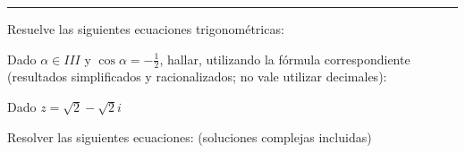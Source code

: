 \documentclass[addpoints,spanish, 12pt,a4paper]{exam}
\begin{document}
\noindent
\rule[2ex]{\textwidth}{2pt}
\begin{questions}

\question Resuelve las siguientes ecuaciones trigonométricas:

\question Dado $\alpha \in III$ y $\cos{\alpha}=-\frac{1}{2}$, hallar, utilizando la fórmula correspondiente (resultados simplificados y racionalizados; no vale utilizar decimales):
\begin{parts}
    \part[1] $\sen{2\alpha}$
\end{parts}

\question Dado $z=\sqrt{2}-\sqrt{2}i$

 \question Resolver las siguientes ecuaciones: (soluciones complejas incluidas)
 \begin{parts}

\end{parts}
\end{questions}
\end{document}
